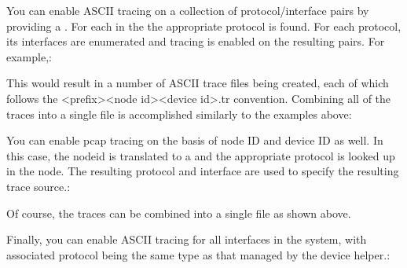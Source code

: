 \documentclass[letterpaper,10pt,english]{sphinxmanual}
\renewcommand{\sphinxcode}[1]{\texttt{\small{#1}}}
\begin{document}
You can enable ASCII tracing on a collection of protocol/interface pairs by
providing a \sphinxcode{}. For each \sphinxcode{} in the \sphinxcode{} the
appropriate protocol is found.  For each protocol, its interfaces are enumerated
and tracing is enabled on the resulting pairs. For example,:

\begin{sphinxVerbatim}[commandchars=\\\{\}]
 
  
\end{sphinxVerbatim}

This would result in a number of ASCII trace files being created, each of which
follows the \textless{}prefix\textgreater{}\sphinxhyphen{}\textless{}node id\textgreater{}\sphinxhyphen{}\textless{}device id\textgreater{}.tr convention. Combining all of the
traces into a single file is accomplished similarly to the examples above:

You can enable pcap tracing on the basis of node ID and device ID as well. In
this case, the node\sphinxhyphen{}id is translated to a \sphinxcode{} and the appropriate
protocol is looked up in the node.  The resulting protocol and interface are
used to specify the resulting trace source.:

\begin{sphinxVerbatim}[commandchars=\\\{\}]
   
\end{sphinxVerbatim}

Of course, the traces can be combined into a single file as shown above.

Finally, you can enable ASCII tracing for all interfaces in the system, with
associated protocol being the same type as that managed by the device helper.:

\begin{sphinxVerbatim}[commandchars=\\\{\}]
 
\end{sphinxVerbatim}
\end{document}
